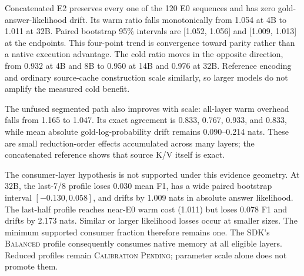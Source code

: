 \documentclass[10pt]{article}
\begin{document}
Concatenated E2 preserves every one of the 120 E0 sequences and has zero
gold-answer-likelihood drift. Its warm ratio falls monotonically from 1.054 at
4B to 1.011 at 32B. Paired bootstrap 95\% intervals are [1.052, 1.056] and
[1.009, 1.013] at the endpoints. This four-point trend is convergence toward
parity rather than a native execution advantage. The cold ratio moves in the
opposite direction, from 0.932 at 4B and 8B to 0.950 at 14B and 0.976 at 32B.
Reference encoding and ordinary source-cache construction scale similarly, so
larger models do not amplify the measured cold benefit.

The unfused segmented path also improves with scale: all-layer warm overhead
falls from 1.165 to 1.047. Its exact agreement is 0.833, 0.767, 0.933, and
0.833, while mean absolute gold-log-probability drift remains 0.090--0.214
nats. These are small reduction-order effects accumulated across many layers;
the concatenated reference shows that source K/V itself is exact.

\begin{table}[H]
\centering
\scriptsize
\caption{Consumer-depth quality and cost. $|\Delta|$LP is mean absolute
gold-answer-log-probability change from E0. Agreement is exact sequence
agreement. Reduced profiles save active PRA K/V proportionally but none passes
both the paired F1 and likelihood gate.}
\resizebox{\linewidth}{!}{%
}
\label{tab:mlx-consumer-depth-scaling}
\end{table}

The consumer-layer hypothesis is not supported under this evidence geometry.
At 32B, the last-7/8 profile loses 0.030 mean F1, has a wide paired bootstrap
interval $[-0.130, 0.058]$, and drifts by 1.009 nats in absolute answer likelihood.
The last-half profile reaches near-E0 warm cost (1.011) but loses 0.078 F1 and drifts by 2.173
nats. Similar or larger likelihood losses occur at smaller sizes. The minimum
supported consumer fraction therefore remains one. The SDK's
\textsc{Balanced} profile consequently consumes native memory at all eligible
layers. Reduced profiles remain \textsc{Calibration Pending}; parameter scale
alone does not promote them.
\end{document}
